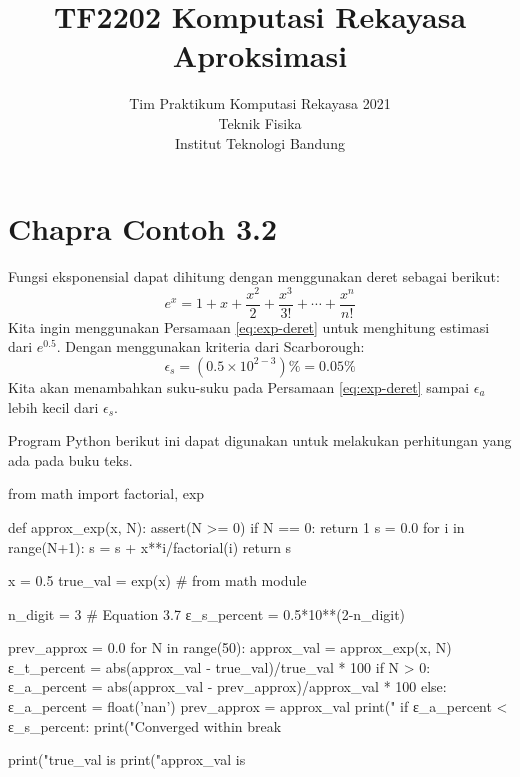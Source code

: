\documentclass[a4paper,11pt,bahasa]{article} %
\begin{document}
\title{%
{\small TF2202 Komputasi Rekayasa}\\
Aproksimasi
}
\author{Tim Praktikum Komputasi Rekayasa 2021\\
Teknik Fisika\\
Institut Teknologi Bandung}
\date{}
\maketitle

\section{Chapra Contoh 3.2}
Fungsi eksponensial dapat dihitung dengan menggunakan deret sebagai berikut:
\begin{equation}
e^{x} = 1 + x + \frac{x^2}{2} + \frac{x^3}{3!} + \cdots + \frac{x^n}{n!}
\label{eq:exp-deret}
\end{equation}
Kita ingin menggunakan Persamaan \eqref{eq:exp-deret} untuk menghitung estimasi
dari $e^{0.5}$.
Dengan menggunakan kriteria dari Scarborough:
\begin{equation*}
\epsilon_{s} = (0.5 \times 10^{2-3}) \% = 0.05 \%
\end{equation*}
Kita akan menambahkan suku-suku pada Persamaan \eqref{eq:exp-deret} sampai $\epsilon_{a}$
lebih kecil dari $\epsilon_{s}$.

Program Python berikut ini dapat digunakan untuk melakukan perhitungan yang ada pada buku teks.
\begin{pythoncode}
from math import factorial, exp

def approx_exp(x, N):
  assert(N >= 0)
  if N == 0:
    return 1
  s = 0.0
  for i in range(N+1):
    s = s + x**i/factorial(i)
  return s
  
x = 0.5
true_val = exp(x) # from math module
  
n_digit = 3
# Equation 3.7
ε_s_percent = 0.5*10**(2-n_digit)
  
prev_approx = 0.0
for N in range(50):
  approx_val = approx_exp(x, N)
  ε_t_percent = abs(approx_val - true_val)/true_val * 100
  if N > 0:
    ε_a_percent = abs(approx_val - prev_approx)/approx_val * 100
  else:
    ε_a_percent = float('nan')
  prev_approx = approx_val
  print("%
  if ε_a_percent < ε_s_percent:
    print("Converged within %
    break

print("true_val   is %
print("approx_val is %
\end{pythoncode}
\end{document}
